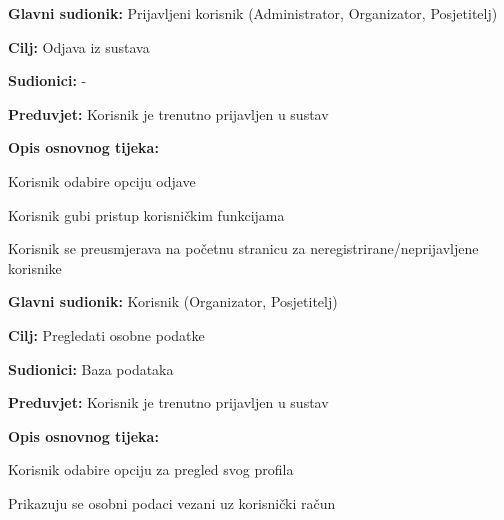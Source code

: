 \noindent {}
\begin{packed_item}
	
	\item \textbf{Glavni sudionik:} Prijavljeni korisnik (Administrator, Organizator, Posjetitelj)
	\item  \textbf{Cilj:} Odjava iz sustava 
	\item  \textbf{Sudionici:} -
	\item  \textbf{Preduvjet:} Korisnik je trenutno prijavljen u sustav
	\item  \textbf{Opis osnovnog tijeka:}
	
	\item[] \begin{packed_enum}
		
		\item Korisnik odabire opciju odjave
		\item Korisnik gubi pristup korisničkim funkcijama
		\item Korisnik se preusmjerava na početnu stranicu za neregistrirane/neprijavljene korisnike 
		
	\end{packed_enum}
\end{packed_item}


\noindent {}
\begin{packed_item}
	
	\item \textbf{Glavni sudionik:} Korisnik (Organizator, Posjetitelj)
	\item  \textbf{Cilj:} Pregledati osobne podatke
	\item  \textbf{Sudionici:} Baza podataka
	\item  \textbf{Preduvjet:} Korisnik je trenutno prijavljen u sustav
	\item  \textbf{Opis osnovnog tijeka:}
	
	\item[] \begin{packed_enum}
		
		\item Korisnik odabire opciju za pregled svog profila
		\item Prikazuju se osobni podaci vezani uz korisnički račun
		
	\end{packed_enum}
\end{packed_item}

